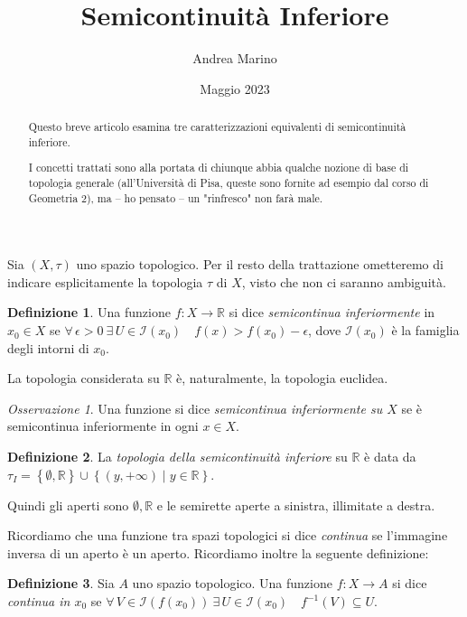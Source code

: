 \documentclass[a4paper, 11pt]{article}
\title{Semicontinuità Inferiore}
\author{Andrea Marino}
\date{Maggio 2023}
\newcommand{\R}{\mathbb{R}}
\newcommand{\I}[1]{\mathcal{I}(#1)}
\theoremstyle{plain} 	%
\theoremstyle{definition}
\newtheorem{definizione}{Definizione}
\theoremstyle{remark}
\newtheorem*{oss*}{Osservazione}
\begin{document}
    \maketitle
    
    \begin{abstract}
        Questo breve articolo esamina tre caratterizzazioni equivalenti di semicontinuità inferiore. 

        I concetti trattati sono alla portata di chiunque abbia qualche nozione di base di topologia generale (all'Università di Pisa, queste sono fornite ad esempio dal corso di Geometria 2), ma -- ho pensato -- un "rinfresco" non farà male.
    \end{abstract}

    Sia $\left(X,\tau\right)$ uno spazio topologico. Per il resto della trattazione ometteremo di indicare esplicitamente la topologia $\tau$ di $X$, visto che non ci saranno ambiguità.
    \begin{definizione}
        Una funzione $f\colon X\to\R$ si dice \emph{semicontinua inferiormente} in $x_0\in X$ se $\forall\,\epsilon>0\ \exists\,U\in\I{x_0}\quad f(x)>f(x_0)-\epsilon$, dove $\I{x_0}$ è la famiglia degli intorni di $x_0$.
    \end{definizione}
    La topologia considerata su $\R$ è, naturalmente, la topologia euclidea.
    \begin{oss*}
        Una funzione si dice \emph{semicontinua inferiormente su $X$} se è semicontinua inferiormente in ogni $x\in X$.
    \end{oss*}
    \begin{definizione}\label{def:top_sci}
        La \emph{topologia della semicontinuità inferiore} su $\R$ è data da $\tau_I=\left\{\emptyset,\R\right\}\cup\left\{(y,+\infty)\mid y\in\R\right\}$.
    \end{definizione}
    Quindi gli aperti sono $\emptyset, \R$ e le semirette aperte a sinistra, illimitate a destra.

    Ricordiamo che una funzione tra spazi topologici si dice \emph{continua} se l'immagine inversa di un aperto è un aperto. Ricordiamo inoltre la seguente definizione:

    \begin{definizione}\label{def:cont_pt}
        Sia $A$ uno spazio topologico. Una funzione $f\colon X\to A$ si dice \emph{continua in $x_0$} se $\forall\,V\in\I{f(x_0)}\ \exists\,U\in\I{x_0}\quad f^{-1}\left(V\right)\subseteq U$.
    \end{definizione}
\end{document}
